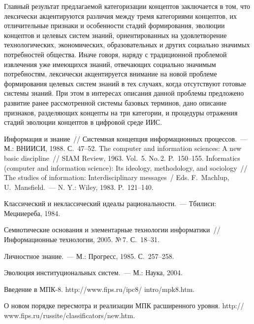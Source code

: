 \begin{multicols}{2}
   Главный результат предлагаемой категоризации концептов заключается в том, что
лексически акцентируются различия между тремя категориями концептов, их отличительные
признаки и особенности стадий формирования, эволюции концептов и целевых систем
знаний, ориентированных на удовлетворение технологических, экономических,
образовательных и других социально значимых потребностей общества. Иначе говоря,
наряду с традиционной проблемой извлечения уже имеющихся знаний, отвечающих
социально значимым потребностям, лексически акцентируется внимание на новой проблеме
формирования целевых систем знаний в тех случаях, когда отсутствуют готовые системы
знаний. При этом в интересах описания данной проблемы предложено развитие ранее
рассмотренной системы базовых терминов, дано описание признаков, разделяющих
концепты на три категории, и процедуры отражения стадий эволюции концептов в цифровой
среде ИИС.

{\small\frenchspacing
{%
\begin{thebibliography}{99}
Информация и знание~// Системная концепция информационных процессов.~--- М.:
ВНИИСИ, 1988.  С.~47--52.
The computer and information sciences: A new basic discipline~// SIAM Review, 1963. Vol.~5.
No.\,2. P.~150--155.
Informatics (computer and information science): Its ideology, methodology, and sociology~// The
studies of information: Interdisciplinary messages~/ Eds. F.~Machlup, U.~Mansfield.~--- N.
Y.: Wiley, 1983. P.~121--140.

Классический и неклассический идеалы рациональности.~--- Тбилиси: Мецниереба, 1984.

Семиотические основания и элементарные технологии информатики~// Информационные
технологии, 2005. №\,7. С.~18--31.

Личностное знание.~--- М.: Прогресс, 1985. С.~257--258.

Эволюция институциональных сис\-тем.~--- М.: Наука, 2004.

Введение в МПК-8. {\sf  http://www.fips.ru/ipc8/}\linebreak
{\sf intro/mpk8.htm}.

О новом порядке пересмотра и реализации МПК расширенного уровня.  {\sf
http://} {\sf www.fips.ru/russite/classificators/new.htm}.


\end{thebibliography}}}
\end{multicols}
